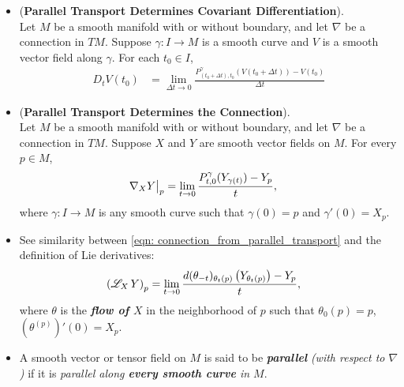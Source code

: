 \documentclass[11pt]{article}
\begin{document}
\begin{itemize}
\item \begin{theorem} (\textbf{Parallel Transport Determines Covariant Differentiation}). \citep{lee2018introduction}\\
Let $M$ be a smooth manifold with or without boundary, and let $\nabla$ be a connection in $TM$. Suppose $\gamma: I \rightarrow M$ is a smooth curve and $V$ is a smooth vector field along $\gamma$. For each $t_0 \in I$,
\begin{align}
D_t V(t_0) &=\lim_{\Delta t \rightarrow 0}\frac{P^{\gamma}_{(t_0+\Delta t), t_0}(V(t_0+\Delta t))  - V(t_0)}{\Delta t} \label{eqn: covariant_derivatives_from_parallel_transport}
\end{align}
\end{theorem}

\item \begin{corollary} (\textbf{Parallel Transport Determines the Connection}). \citep{lee2018introduction} \\
Let $M$ be a smooth manifold with or without boundary, and let  $\nabla$ be a connection in $TM$. Suppose $X$ and $Y$ are smooth vector fields on $M$. For every $p \in M$,
\begin{align}
\nabla_{X}{Y}\bigr|_{p}&=\lim_{t \rightarrow 0}\frac{P^{\gamma}_{t, 0}(Y_{\gamma(t)})  - Y_p}{t}, \label{eqn: connection_from_parallel_transport}
\end{align} where $\gamma: I \rightarrow M$ is any smooth curve such that $\gamma(0) = p$ and $\gamma'(0) = X_p$.
\end{corollary}

\item \begin{remark}
See similarity between \eqref{eqn: connection_from_parallel_transport} and the definition of Lie derivatives:
\begin{align*}
\left(\mathscr{L}_{X}\,Y\right)_{p}  &= \lim_{t\rightarrow 0}\frac{ d(\theta_{-t})_{\theta_{t}(p)}\left(Y_{\theta_t(p)}\right)   - Y_{p}}{t},
\end{align*} where $\theta$ is the \emph{\textbf{flow of $X$}} in the neighborhood of $p$ such that $\theta_0(p) = p$, $(\theta^{(p)})'(0) = X_p$.
\end{remark}

\item \begin{remark}
A smooth vector or tensor field on $M$ is said to be \emph{\textbf{parallel}} \emph{(with respect to $\nabla$)} if it is \emph{parallel along \textbf{every smooth curve} in $M$}. 
\end{remark}


\end{itemize}
\end{document}
